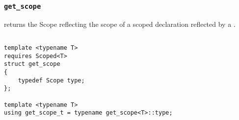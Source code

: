 
\subsubsection{\texttt{get\_scope}}

returns the Scope reflecting the scope of a scoped declaration reflected by a .

\begin{verbatim}

template <typename T>
requires Scoped<T>
struct get_scope
{
	typedef Scope type;
};
	
template <typename T>
using get_scope_t = typename get_scope<T>::type;

\end{verbatim}
